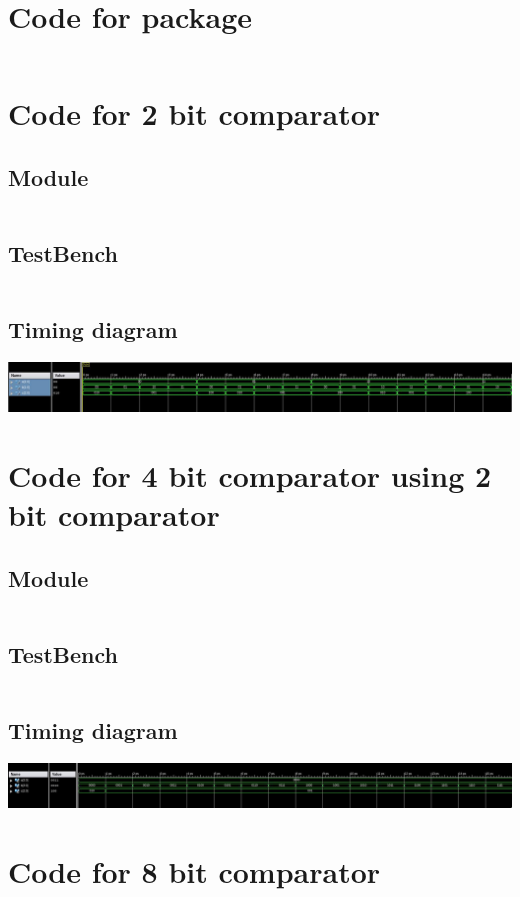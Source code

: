 \documentclass[titlepage]{article}
\begin{document}
    \section{Code for package}
    \inputminted{vhdl}{./codes/comparator_package.vhd}
    \section{Code for 2 bit comparator}
        \subsection{Module}
        \inputminted{vhdl}{./codes/a5_1a.vhd}
        \subsection{TestBench}
        \inputminted{vhdl}{./codes/tb_a5_1a.vhd}
        \subsection{Timing diagram}
        \includegraphics[width=19cm]{./figures/2bit_td.jpeg}
    \section{Code for 4 bit comparator using 2 bit comparator}
        \subsection{Module}
        \inputminted{vhdl}{./codes/a5_1b.vhd}
        \subsection{TestBench}
        \inputminted{vhdl}{./codes/tb_a5_1b.vhd}
        \subsection{Timing diagram}
        \includegraphics[width=19cm]{./figures/4bit_td.jpeg}
    \section{Code for 8 bit comparator}
\end{document}
